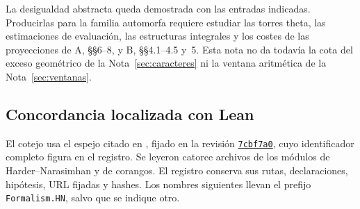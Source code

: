 La desigualdad abstracta queda demostrada con las entradas indicadas.
Producirlas para la familia automorfa requiere estudiar las torres theta,
las estimaciones de evaluación, las estructuras integrales y los costes
de las proyecciones de A, §§6--8, y B, §§4.1--4.5 y~5.
Esta nota no da todavía la cota del exceso geométrico de la
Nota~\ref{sec:caracteres} ni la ventana aritmética de la
Nota~\ref{sec:ventanas}.

\subsection{Concordancia localizada con Lean}
\label{subsec:marcos-lean}

El cotejo usa el espejo citado en \cite{lean}, fijado en la revisión
\href{https://github.com/CocoSgt/riemann-hypothesis-lean/tree/7cbf7a0c32fca1badf05931879a37c3f8a2b03b4}{\texttt{7cbf7a0}},
cuyo identificador completo figura en el registro.
Se leyeron catorce archivos de los módulos de Harder--Narasimhan y
de corangos. El registro conserva sus rutas, declaraciones, hipótesis,
URL fijadas y hashes. Los nombres siguientes llevan el prefijo
\texttt{Formalism.HN}, salvo que se indique otro.

